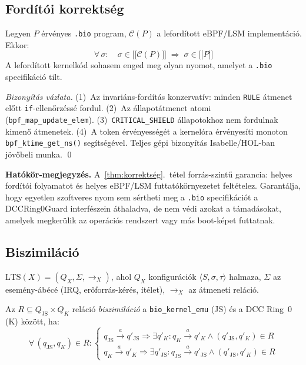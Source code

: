 \documentclass[11pt,a4paper,twoside]{article}
\newcommand{\sem}[1]{\mathopen{[\![}#1\mathclose{]\!]}}
\newcommand{\tm}[1]{\texttt{#1}}
\begin{document}
\subsection{Fordítói korrektség}

\begin{tetel}\label{thm:korrektség}
Legyen $P$ érvényes \texttt{.bio} program, $\mathcal{C}(P)$ a lefordított
eBPF/LSM implementáció. Ekkor:
\[
  \forall\,\sigma:\quad \sigma \in \sem{\mathcal{C}(P)} \;\Longrightarrow\; \sigma \in \sem{P}
\]
A lefordított kernelkód sohasem enged meg olyan nyomot, amelyet a
\texttt{.bio} specifikáció tilt.
\end{tetel}
\begin{proof}[Bizonyítás vázlata]
(1)~Az invariáns-fordítás konzervatív: minden \texttt{RULE} átmenet előtt
\texttt{if}-ellenőrzéssé fordul.
(2)~Az állapotátmenet atomi (\texttt{bpf\_map\_update\_elem}).
(3)~\tm{CRITICAL\_SHIELD} állapotokhoz nem fordulnak kimenő átmenetek.
(4)~A token érvényességét a kernelóra érvényesíti monoton
\texttt{bpf\_ktime\_get\_ns()} segítségével.
Teljes gépi bizonyítás Isabelle/HOL-ban jövőbeli munka. \qed
\end{proof}

\begin{mdframed}[style=notebox]
\textbf{Hatókör-megjegyzés.} A~\ref{thm:korrektség}.~tétel forrás-szintű
garancia: helyes fordítói folyamatot és helyes eBPF/LSM futtatókörnyezetet
feltételez. Garantálja, hogy egyetlen szoftveres nyom sem sértheti meg a
\texttt{.bio} specifikációt a DCCRing0Guard interfészein áthaladva, de nem
védi azokat a támadásokat, amelyek megkerülik az operációs rendszert vagy
más boot-képet futtatnak.
\end{mdframed}

\subsection{Biszimiláció}

\begin{definicio}[LTS]\label{def:lts_hu}
$\mathrm{LTS}(X) = (Q_X, \Sigma, {\to_X})$, ahol $Q_X$ konfigurációk
$\langle S,\sigma,\tau\rangle$ halmaza, $\Sigma$ az esemény-ábécé (IRQ,
erőforrás-kérés, ítélet), ${\to_X}$ az átmeneti reláció.
\end{definicio}

\begin{definicio}[Biszimiláció]\label{def:biszim_hu}
Az $R \subseteq Q_\mathrm{JS} \times Q_K$ reláció \emph{biszimiláció}
a \texttt{bio\_kernel\_emu} (JS) és a DCC Ring~0 (K) között, ha:
\[
\forall\,(q_\mathrm{JS},q_K)\in R:\begin{cases}
  q_\mathrm{JS}\xrightarrow{a}q'_\mathrm{JS} \Rightarrow \exists q'_K: q_K\xrightarrow{a}q'_K \wedge (q'_\mathrm{JS},q'_K)\in R \\
  q_K\xrightarrow{a}q'_K \Rightarrow \exists q'_\mathrm{JS}: q_\mathrm{JS}\xrightarrow{a}q'_\mathrm{JS} \wedge (q'_\mathrm{JS},q'_K)\in R
\end{cases}
\]
\end{definicio}
\end{document}
